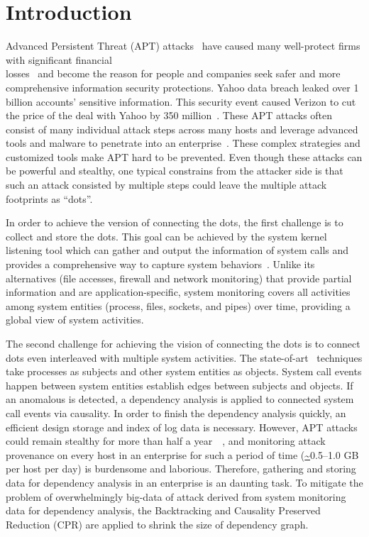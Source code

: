 \section{Introduction}
Advanced Persistent Threat (APT) attacks~\cite{fireeye:anatomy,aptsymantec} have caused many well-protect firms with significant financial\\ losses~\cite{ebay,opm,target,homedepot} and become the reason for people and companies seek safer and more comprehensive information security protections. Yahoo data breach leaked over 1 billion accounts' sensitive information. This security event caused Verizon to cut the price of the deal with Yahoo by 350 million~\cite{ya:yahooleak,aptsymantec}. These APT attacks often consist of many individual attack steps across many hosts and leverage advanced tools and malware to penetrate into an enterprise~\cite{fireeye:anatomy,aptsymantec}. These complex strategies and customized tools make APT hard to be prevented. Even though these attacks can be powerful and stealthy, one typical constrains from the attacker side is that such an attack consisted by multiple steps could leave the multiple attack footprints as ``dots''.

In order to achieve the version of connecting the dots, the first challenge is to collect and store the dots. This goal can be achieved by the system kernel listening tool which can gather and output the information of system calls and provides a comprehensive way to capture system behaviors~\cite{backtracking,backtracking2}. Unlike its alternatives (file accesses, firewall and network monitoring) that provide partial  information and are application-specific, system monitoring covers all activities among system entities (process, files, sockets, and pipes) over time, providing a global view of system activities.

The second challenge for achieving the vision of connecting the dots is to connect dots even interleaved with multiple system activities. The state-of-art~\cite{taser,backtracking,backtracking2} techniques take processes as subjects and other system entities as objects. System call events happen between system entities establish edges between subjects and objects. If an anomalous is detected, a dependency analysis is applied to  connected system call events via causality. In order to finish the dependency analysis quickly, an efficient design storage and index of log data is necessary. However, APT attacks could remain stealthy for more than half a year~~\cite{trustwave}, and monitoring attack provenance on every host in an enterprise for such a period of time (\url{~}0.5--1.0 GB per host per day) is burdensome and laborious. Therefore, gathering and storing data for dependency analysis in an enterprise is an daunting task. To mitigate the problem of overwhelmingly big-data of attack derived from system monitoring data for dependency analysis, the Backtracking and Causality Preserved Reduction (CPR) are applied to shrink the size of dependency graph.

